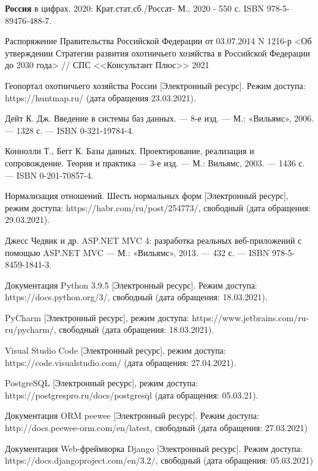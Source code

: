\newpage
	\begin{thebibliography}{9} 
		
		 \textbf{Россия} в цифрах. 2020: Крат.стат.сб./Россат- М., 2020 - 550 с. ISBN 978-5-89476-488-7.
		
		 Распоряжение Правительства Российской Федерации от 03.07.2014 N 1216-р <Об утверждении Стратегии развития охотничьего хозяйства в Российской Федерации до 2030 года> // СПС <<Консультант Плюс>> 2021 
		
		 Геопортал охотничьего хозяйства России [Электронный ресурс]. Режим доступа: https://huntmap.ru/ (дата обращения 23.03.2021).
		
		 Дейт К. Дж. Введение в системы баз данных. — 8-е изд. — М.: «Вильямс», 2006. — 1328 с. — ISBN 0-321-19784-4.
		
		 Коннолли Т., Бегг К. Базы данных. Проектирование, реализация и сопровождение. Теория и практика — 3-е изд. — М.: Вильямс, 2003. — 1436 с. — ISBN 0-201-70857-4.
		
		 Нормализация отношений. Шесть нормальных форм [Электронный ресурс], режим доступа: https://habr.com/ru/post/254773/, свободный (дата обращения: 29.03.2021).
		
		 Джесс Чедвик и др. ASP.NET MVC 4: разработка реальных веб-приложений с помощью ASP.NET MVC — М.: «Вильямс», 2013. — 432 с. — ISBN 978-5-8459-1841-3.
		
		 Документация Python 3.9.5 [Электронный ресурс]. Режим доступа: https://docs.python.org/3/, свободный (дата обращения: 18.03.2021).

		
		 PyCharm [Электронный ресурс], режим доступа: https://www.jetbrains.com/ru-ru/pycharm/, свободный (дата обращения:
		18.03.2021).
		
		 Visual Studio Code [Электронный ресурс], режим доступа: https://code.visualstudio.com/ (дата обращения: 27.04.2021).
		
		 PostgreSQL [Электронный ресурс], режим доступа: https://postgrespro.ru/docs/postgresql (дата обращения: 05.03.21).
		
		 Документация ORM peewee [Электронный ресурс]. Режим доступа: http://docs.peewee-orm.com/en/latest, свободный (дата обращения: 27.03.2021)
		
		 Документация Web-фреймворка Django [Электронный ресурс].
		Режим доступа: https://docs.djangoproject.com/en/3.2/, свободный (дата обращения: 05.03.2021)
		
		
		
	\end{thebibliography}